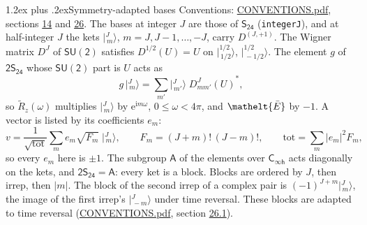 \documentclass[10pt,a4paper]{article}
\makeatletter
\renewcommand\section{\@startsection{section}{1}{\z@}{-3ex plus -1ex minus -.2ex}%
  {1.2ex plus .2ex}{\normalfont\large\sffamily\bfseries\color{parttitle}}}
\numberwithin{equation}{section}
\newcommand{\eltfont}[1]{{\let\sigma\eltsigma\mathelt{#1}}}
\newcommand{\grp}[1]{\mathsf{#1}}
\newcommand{\elt}[1]{\eltfont{#1}}
\newcommand{\iunit}{\mathrm{i}}
\newcommand{\expe}{\mathrm{e}}
\newcommand{\irrJp}[2]{D^{(#1,#2)}}
\newcommand{\wignerD}[1]{D^{#1}}
\newcommand{\conj}[1]{{#1}^{*}}
\newcommand{\jm}[2]{\bigl\lvert{}^{#1}_{\,#2}\bigr\rangle}
\newcommand{\barred}[1]{\bar{#1}}
\newcommand{\lift}[1]{\tilde{#1}}
\makeatother
\begin{document}
\section{Symmetry-adapted bases}\label{s:bases}
Conventions: \href{../../CONVENTIONS.pdf}{CONVENTIONS.pdf}, sections \href{../../../rotation/CONVENTIONS.pdf\#conv.14}{14} and \href{../../CONVENTIONS.pdf\#conv.26}{26}.
\leavevmode\label{n:index.m}\label{n:vector.ket}The bases at integer $J$ are those of \href{../../../rotation/data/pdf/S24.pdf}{$\grp{S_{24}}$} (\texttt{integerJ}), and at half-integer $J$ the kets $\jm{J}{m}$, $m = J, J-1, \dots, -J$, carry $\irrJp{J}{+1}$. \label{n:matrix.wigner}The Wigner matrix $\wignerD{J}$ of $\grp{SU(2)}$ satisfies $\wignerD{1/2}(U) = U$ on $\jm{1/2}{1/2}$, $\jm{1/2}{-1/2}$. The element $g$ of $\grp{2S_{24}}$ whose $\grp{SU(2)}$ part is $U$ acts as
\begin{equation}\label{e:action}g\,\jm{J}{m} = \sum_{m'} \jm{J}{m'}\; \conj{\wignerD{J}_{m m'}(U)},\end{equation}
so $\lift{R}_{z}(\omega)$ multiplies $\jm{J}{m}$ by $\expe^{\iunit m\omega}$, $0 \le \omega < 4\pi$, and $\elt{\barred{E}}$ by $-1$. \label{n:index.ketcoefficient}\label{n:vector.basis.symmetry}\label{n:index.ketweight}\label{n:index.total}A vector is listed by its coefficients $e_m$:
\begin{equation}\label{e:ket}v = \frac{1}{\sqrt{\mathrm{tot}}}\sum_m e_m\sqrt{F_m}\;\jm{J}{m},\qquad F_m = (J+m)!\,(J-m)!,\qquad \mathrm{tot} = \sum_m |e_m|^2F_m,\end{equation}
so every $e_m$ here is $\pm 1$.
\leavevmode\label{n:group.A}The subgroup $\grp{A}$ of the elements over $\grp{C_{\infty h}}$ acts diagonally on the kets, and $\grp{2S_{24}} = \grp{A}$: every ket is a block. Blocks are ordered by $J$, then irrep, then $|m|$. The block of the second irrep of a complex pair is $(-1)^{J+m}\jm{J}{m}$, the image of the first irrep's $\jm{J}{-m}$ under time reversal. These blocks are adapted to time reversal (\href{../../CONVENTIONS.pdf}{CONVENTIONS.pdf}, section \href{../../CONVENTIONS.pdf\#conv.26.1}{26.1}).
\end{document}
